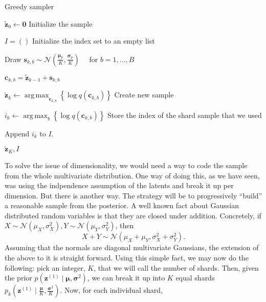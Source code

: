 \documentclass{article}
\renewcommand{\vec}[1]{\mathbf{#1}}
\newcommand{\Norm}{\mathcal{N}}
\newcommand{\MU}{\boldsymbol\mu}
\newcommand{\SIGMA}{\boldsymbol\sigma}
\DeclareMathOperator*{\argmax}{arg\,max}
\begin{document}
\begin{algorithm}
  \caption{Greedy sampler}
  \label{alg:greedy_sampler}
  \begin{algorithmic}
    \Procedure{Greedy-Sampler}{$K, B, \MU_p, \SIGMA_p^2, q, \langle s_1, \hdots s_k \rangle$}

    \State $\vec{\tilde{z}}_0 \gets \vec{0}$
    \Comment Initialize the sample

    \State $I = ()$
    \Comment Initialize the index set to an empty list

    \State Draw $\vec{s}_{k, b} \sim \Norm\left(\frac{\MU_p}{K}, \frac{\SIGMA_p}{K}
    \right)\quad$ for $b = 1,\hdots,B$
    
    \State $\vec{c}_{k, b} = \vec{\tilde{z}}_{k - 1} + \vec{s}_{k, b}$

    \State $\vec{\tilde{z}}_k \gets \argmax_{\vec{c}_{k, b}} \left\{ \log q(\vec{c}_{k, b}) \right\}$
    \Comment Create new sample

    \State $i_k \gets \argmax_{b} \left\{ \log q(\vec{c}_{k, b}) \right\}$
    \Comment Store the index of the shard sample that we used

    \State Append $i_k$ to $I$.
    
    \EndFor

    \State \Return $\vec{\tilde{z}}_K, I$
    
    \EndProcedure
  \end{algorithmic}
\end{algorithm}
\par
To solve the issue of dimensionality, we would need a way to code the sample
from the whole multivariate distribution. One way of doing this, as we have
seen, was using the indpendence assumption of the latents and break it up per
dimension. But there is another way. The strategy will be to progressively ``build''
a reasonable sample from the posterior. A well known fact about Gaussian
distributed random variables is that they are closed under addition. Concretely,
if $X \sim \Norm(\mu_X, \sigma^2_X), Y \sim \Norm(\mu_Y, \sigma^2_Y)$, then
\[
  X + Y \sim \Norm(\mu_X + \mu_Y, \sigma_X^2 + \sigma_Y^2).
\]
Assuming that the normals are diagonal multivariate Gaussians, the extension of
the above to it is straight forward.
Using this simple fact, we may now do the following: pick an integer, $K$, that
we will call the number of shards. Then, given the prior $p(\vec{z}^{(1)} \mid
\MU, \SIGMA^2)$, we can break it up into $K$ equal shards $p_k\left(\vec{z}^{(1)}
\mid \frac{\MU}{K}, \frac{\SIGMA^2}{K}\right)$. Now, for each individual shard,
\end{document}
